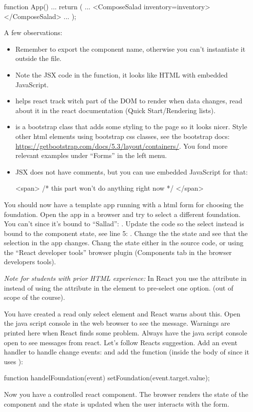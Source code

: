 \documentclass[fleqn, article, a4paper]{memoir}
\begin{document}
\begin{Assignments}
\begin{Code}
function App() {
  ...
  return (
      ...
      <ComposeSalad inventory={inventory}></ComposeSalad>
      ...
);}
\end{Code}
\noindent A few observations:
\begin{itemize}
  \item Remember to export the component name, otherwise you can't instantiate it outside the file.
  \item Note the JSX code in the function, it looks like HTML with embedded JavaScript.
  \item {} helps react track witch part of the DOM to render when data changes, read about it in the react documentation (Quick Start/Rendering lists).
   \item {} is a bootstrap class that adds some styling to the page so it looks nicer. Style other html elements using bootstrap css classes, see the bootstrap docs: \url{https://getbootstrap.com/docs/5.3/layout/containers/}. You fond more relevant examples under ``Forms'' in the left menu.
   \item JSX does not have comments, but you can use embedded JavaScript for that:
\begin{Code}
<span>  {/* this part won't do anything right now */}  </span>
\end{Code}
\end{itemize}

\item You should now have a template app running with a html form for choosing the foundation. Open the app in a browser and try to select a different foundation. You can't since it's bound to ``Sallad'': . Update the code so the select instead is bound to the component state, see line 5: . Change the the state and see that the selection in the app changes. Chang the state either in the source code, or using the ``React developer tools'' browser plugin (Components tab in the browser developers tools).

\emph{Note for students with prior HTML experience:} In React you use the  attribute in  instead of using the  attribute in the  element to pre-select one option. (out of scope of the course).

You have created a read only select element and React warns about this. Open the java script console in the web browser to see the message. Warnings are printed here when React finds some problem. Always have the java script console open to see messages from react. Let's follow Reacts suggestion. Add an event handler to handle change events:  and add the function (inside the body of  since it uses ):
\begin{Code}
function handelFoundation(event) {
  setFoundation(event.target.value);
}
\end{Code}
\noindent Now you have a controlled react component. The browser renders the state of the component and the state is updated when the user interacts with the form.


\end{Assignments}
\end{document}
